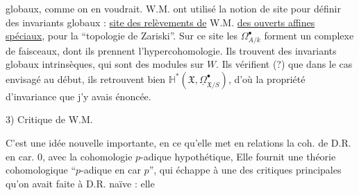 
globaux, comme on en voudrait.   W.M. ont utilisé la notion de  site pour définir des invariants globaux : \uline{site des relèvements de} W.M. \uline{des ouverts affines spéciaux}, pour la ``topologie de Zariski''. Sur ce site les $\Omega^\bullet_{A/k}$ forment un complexe de faisceaux, dont ils prennent l'hypercohomologie. Ils trouvent des invariants globaux intrinsèques, qui sont des modules sur $W$. Ils vérifient (?) que dans le cas envisagé au début, ils retrouvent bien $\mathbb H^*(\mathfrak X,\underline{\Omega}^\bullet_{\mathfrak X/S})$, d'où la propriété d'invariance que j'y avais énoncée.


3) Critique de W.M.

C'est une idée nouvelle importante, en ce qu'elle met en relations la coh. de D.R. en car. 0, avec la cohomologie $p$-adique hypothétique,  Elle fournit une théorie cohomologique ``$p$-adique en car $p$'', qui échappe à une des critiques principales qu'on avait faite à D.R. naïve : elle

